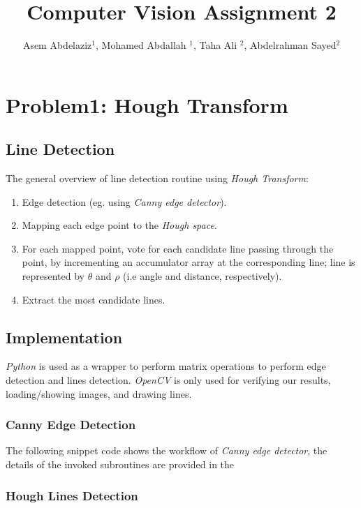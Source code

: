 \documentclass[journal,9pt,onecolumn,draftclsnofoot]{ieeeconf} %
\title{\LARGE \bf
Computer Vision Assignment 2
}
\author{
 Asem Abdelaziz$^{1}$,
 Mohamed Abdallah  $^{1}$, 
 Taha Ali $^{2}$,
 Abdelrahman Sayed$^{2}$
}
\begin{document}
\maketitle
\thispagestyle{empty}
\pagestyle{empty}


\section*{Problem1: Hough Transform} 
\subsection*{Line Detection} 


The general overview of line detection routine using \textit{Hough Transform}:
\begin{enumerate}

\item Edge detection (eg. using \textit{Canny edge detector}).
\item Mapping each edge point to the \textit{Hough space}.
\item For each mapped point, vote for each candidate line passing through the point, by incrementing an accumulator array at the corresponding line; line is represented by $\theta$ and $\rho$ (i.e angle and distance, respectively).
\item Extract the most candidate lines.

\end{enumerate} 
\subsection*{Implementation}

\textit{Python} is used as a wrapper to perform matrix operations to perform edge detection and lines detection. \textit{OpenCV} is only used for verifying our results, loading/showing images, and drawing lines.


\subsubsection*{Canny Edge Detection}
The following snippet code shows the workflow of \textit{Canny edge detector}, the details of the invoked subroutines are provided in the ~ 


\subsubsection*{ Hough Lines Detection }
\end{document}

